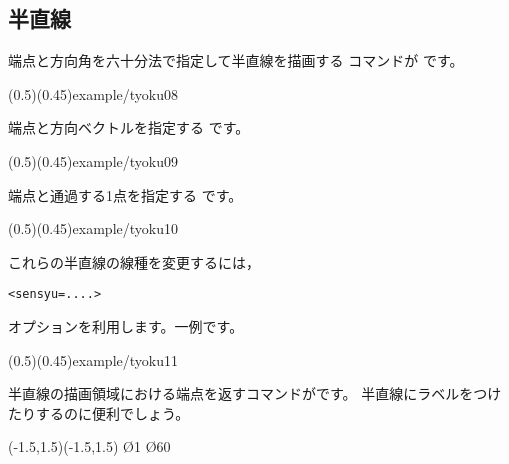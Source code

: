 \subsection{半直線}
端点と方向角を六十分法で指定して半直線を描画する
コマンドが  です。

(0.5)(0.45){example/tyoku08}

端点と方向ベクトルを指定する  です。

(0.5)(0.45){example/tyoku09}

端点と通過する1点を指定する  です。

(0.5)(0.45){example/tyoku10}

これらの半直線の線種を変更するには，
\begin{jquote}
\begin{verbatim}
<sensyu=....>
\end{verbatim}
\end{jquote}
オプションを利用します。一例です。

\showexample[鎖線で半直線](0.5)(0.45){example/tyoku11}

半直線の描画領域における端点を返すコマンドがです。
半直線にラベルをつけたりするのに便利でしょう。

\begin{showEx}{}
\begin{zahyou}[ul=10mm]%
(-1.5,1.5)(-1.5,1.5)
  \En\O{1}
  \kHantyokusen\O{60}
  \Put\HtyokuT[se]{$\ell$}
\end{zahyou}
\end{showEx}
